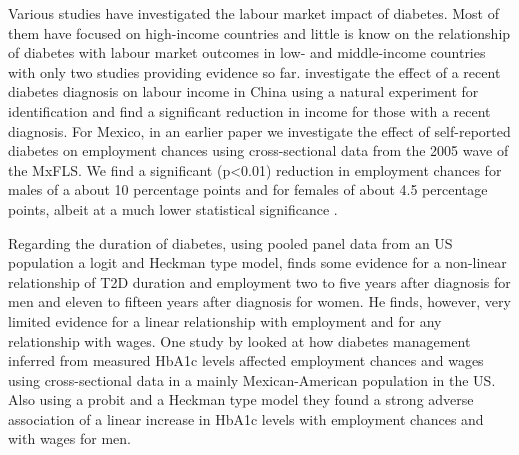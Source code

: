 Various studies have investigated the labour market impact of diabetes.
Most of them have focused on high-income countries and little is know
on the relationship of diabetes with labour market outcomes in low-
and middle-income countries with only two studies providing evidence
so far. \citet{Liu2014} investigate the effect of a recent diabetes
diagnosis on labour income in China using a natural experiment for
identification and find a significant reduction in income for those
with a recent diagnosis. For Mexico, in an earlier paper we investigate
the effect of self-reported diabetes on employment chances using cross-sectional
data from the 2005 wave of the \ac{MxFLS}. We find a significant
(p<0.01) reduction in employment chances for males of a about 10 percentage
points and for females of about 4.5 percentage points, albeit at a
much lower statistical significance \citep{Seuring2015}. 

Regarding the duration of diabetes, using pooled panel data from an
US population a logit and Heckman type model, \citet{Minor2013} finds
some evidence for a non-linear relationship of \ac{T2D} duration
and employment two to five years after diagnosis for men and eleven
to fifteen years after diagnosis for women. He finds, however, very
limited evidence for a linear relationship with employment and for
any relationship with wages. One study by \citet{BrownIII2011} looked
at how diabetes management inferred from measured \ac{HbA1c} levels
affected employment chances and wages using cross-sectional data in
a mainly Mexican-American population in the US. Also using a probit
and a Heckman type model they found a strong adverse association of
a linear increase in \ac{HbA1c} levels with employment chances and
with wages for men.

